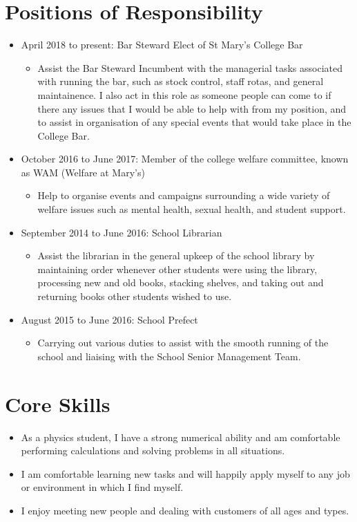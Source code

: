 \documentclass[10pt, a4paper]{article}
\begin{document}
\section{Positions of Responsibility}
\begin{itemize}
    \item April 2018 to present: Bar Steward Elect of St Mary's College Bar
        \begin{itemize}
            \item Assist the Bar Steward Incumbent with the managerial tasks associated with running the bar, such as stock control, staff rotas, and general maintainence. 
                I also act in this role as someone people can come to if there any issues that I would be able to help with from my position, and to assist in organisation of any special events that would take place in the College Bar. 
        \end{itemize}
	\item October 2016 to June 2017: Member of the college welfare committee, known as WAM (Welfare at Mary's)
	\begin{itemize}
		\item Help to organise events and campaigns surrounding a wide variety of welfare issues such as mental health, sexual health, and student support.
	\end{itemize}
	\item September 2014 to June 2016: School Librarian
	\begin{itemize}
		\item Assist the librarian in the general upkeep of the school library by maintaining order whenever other students were using the library, processing new and old books, stacking shelves, and taking out and returning books other students wished to use.
	\end{itemize}
	\item August 2015 to June 2016: School Prefect
	\begin{itemize}
		\item Carrying out various duties to assist with the smooth running of the school and liaising with the School Senior Management Team.
	\end{itemize}
\end{itemize}

\section{Core Skills}
\begin{itemize}
	\item As a physics student, I have a strong numerical ability and am comfortable performing calculations and solving problems in all situations.
	\item I am comfortable learning new tasks and will happily apply myself to any job or environment in which I find myself.
	\item I enjoy meeting new people and dealing with customers of all ages and types.
\end{itemize}
\end{document}
